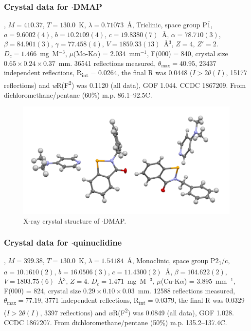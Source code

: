 \begin{refsection}
\subsubsection{Crystal data for \texorpdfstring{$\cdot$DMAP}{C21H21N3OSe}}
, $M=410.37$, $T=130.0$~K, $\lambda=0.71073$~\AA, Triclinic, space group P$\bar{1}$, $a = 9.6002(4)$, $b = 10.2109(4)$, $c = 19.8380(7)$~\AA, $\alpha = 78.710(3)$\degree, $\beta = 84.901(3)$\degree, $\gamma = 77.458(4)$\degree, $V = 1859.33(13)$~\AA$^{3}$, $Z = 4$, $Z\prime = 2$.
$D_{c}= 1.466$~mg~M$^{-3}$, $\mu$(Mo-K$\alpha$) = 2.034~mm$^{-1}$, F(000) = 840, crystal size $0.65 \times 0.24 \times 0.37$~mm.
36541 reflections measured, $\theta_{\mathrm{max}} = 40.95$\degree, 23437 independent reflections, R\textsubscript{int} = 0.0264, the final R was 0.0448 ($I > 2\theta(I)$, 15177 reflections) and \emph{w}R(F\textsuperscript{2}) was 0.1120 (all data), GOF 1.044.
CCDC 1867209.
From dichloromethane/pentane (60\%) m.p. 86.1--92.5\degree C.

\begin{figure}
  \includegraphics[width=0.6\linewidth]{Figures/ebs-bn-dmap-xtal.pdf}
  \caption{X-ray crystal structure of \texorpdfstring{$\cdot$DMAP}{C21H21N3OSe}.}
\end{figure}

\subsubsection{Crystal data for \texorpdfstring{$\cdot$quinuclidine}{C21H24N2OSe}}
, $M=399.38$, $T=130.0$~K, $\lambda=1.54184$~\AA, Monoclinic, space group P2\textsubscript{1}/c, $a = 10.1610(2)$, $b = 16.0506(3)$, $c = 11.4300(2)$~\AA, $\beta = 104.622(2)$\degree, $V = 1803.75(6)$~\AA$^{3}$, $Z = 4$.
$D_{c}= 1.471$~mg~M$^{-3}$, $\mu$(Cu-K$\alpha$) = 3.895~mm$^{-1}$, F(000) = 824, crystal size $0.29 \times 0.10 \times 0.03$~mm.
12588 reflections measured, $\theta_{\mathrm{max}} = 77.19$\degree, 3771 independent reflections, R\textsubscript{int} = 0.0379, the final R was 0.0329 ($I > 2\theta(I)$, 3397 reflections) and \emph{w}R(F\textsuperscript{2}) was 0.0849 (all data), GOF 1.028.
CCDC 1867207.
From dichloromethane/pentane (50\%) m.p. 135.2--137.4\degree C.


\end{refsection}
